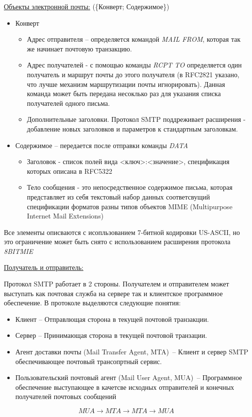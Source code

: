 \documentclass[a4paper,12pt]{report}
\begin{document}
	 \underline{Объекты электронной почты:} (\{Конверт; Содержимое\})
	 \begin{itemize}
	 	\item Конверт
	 	   \begin{itemize}
	 	       \item Адрес отправителя -- определяется командой \textit{MAIL FROM}, которая так же начинает почтовую транзакцию. 
	 	       \item Адрес получателей - с помощью команды \textit{RCPT TO} определяется один получатель и маршрут почты до этого получателя (в RFC2821 указано, что лучше механизм маршрутизации почты игнорировать). Данная команда может быть передана несоклько раз для указания списка получателей одного письма.
	 	       \item Дополнительные заголовки. Протокол SMTP поддреживает расширения - добавление новых заголовков и параметров к стандартным заголовкам.
	 	   \end{itemize}
	 	  \item Содержимое -- передается после отправки команды \textit{DATA}
	 	  \begin{itemize}
	 	      \item Заголовок - список полей вида <ключ>:<значение>, спецификация которых описана в RFC5322
	 	      \item Тело сообщения - это непосредственное содержимое письма, которая представляет из себя текстовый набор данных соответсвущий спецификации форматов разны типов объектов MIME (Multipurpose Internet Mail Extensions)
	 	  \end{itemize}
	 \end{itemize}
	 Все элементы описваются с исопльзованием 7-битной кодировки US-ASCII, но это ограничение может быть снято с использованием расширения протокола \textit{8BITMIE}
	
	 \underline{Получатель и отправитель:}
	 
	 Протокол SMTP работает в 2 стороны. Получателем и отправителем может выступать как почтовая служба на сервере так и клиентское программное обеспечение. В протоколе выделяются следующие понятия:
	 \begin{itemize}
	     \item Клиент -- Отправлющая сторона в текущей почтовой транзакции.
	     \item Сервер -- Принимающая сторона в текущей почтовой транзации.
	     \item Агент доставки почты (Mail Transfer Agent, MTA)~-- Клиент и сервер SMTP обеспечивающее почтовый трансопртный сервис.
	     \item Пользовательский почтовый агент (Mail User Agent, MUA)~-- Программное обеспечение выступающее в качетсве исходных отправителей и конечных получателей почтовых сообщений
	 \end{itemize}
	 $$MUA\rightarrow MTA \rightarrow MTA \rightarrow MUA$$
	 
\end{document}
